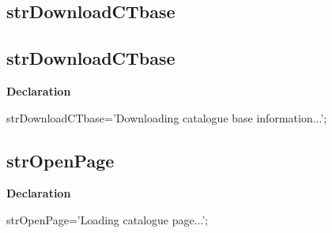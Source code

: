 \documentclass{report}
\newif\ifpdf
\begin{document}
\subsection*{\large{\textbf{strDownloadCTbase}}\normalsize\hspace{1ex}\hrulefill}
\else
\subsection*{strDownloadCTbase}
\fi
\label{trstrings-strDownloadCTbase}
\begin{list}{}{
\setlength{\itemindent}{0cm}
\setlength{\listparindent}{0cm}
\setlength{\leftmargin}{\evensidemargin}
\addtolength{\leftmargin}{\tmplength}
\settowidth{\labelsep}{X}
\addtolength{\leftmargin}{\labelsep}
\setlength{\labelwidth}{\tmplength}
}
\item[\textbf{Declaration}\hfill]
\ifpdf
\begin{flushleft}
\fi
\begin{ttfamily}
strDownloadCTbase='Downloading catalogue base information...';\end{ttfamily}

\ifpdf
\end{flushleft}
\fi

\end{list}
\ifpdf
\subsection*{\large{\textbf{strOpenPage}}\normalsize\hspace{1ex}\hrulefill}
\else
\subsection*{strOpenPage}
\fi
\label{trstrings-strOpenPage}
\begin{list}{}{
\setlength{\itemindent}{0cm}
\setlength{\listparindent}{0cm}
\setlength{\leftmargin}{\evensidemargin}
\addtolength{\leftmargin}{\tmplength}
\settowidth{\labelsep}{X}
\addtolength{\leftmargin}{\labelsep}
\setlength{\labelwidth}{\tmplength}
}
\item[\textbf{Declaration}\hfill]
\ifpdf
\begin{flushleft}
\fi
\begin{ttfamily}
strOpenPage='Loading catalogue page...';\end{ttfamily}

\ifpdf
\end{flushleft}
\fi

\end{list}
\ifpdf
\end{document}
